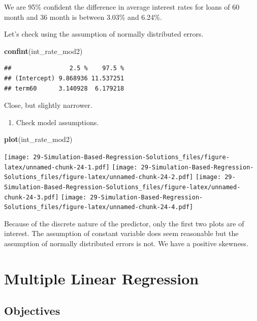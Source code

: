\documentclass[
]{book}
\newenvironment{Shaded}{\begin{snugshade}}{\end{snugshade}}
\newcommand{\KeywordTok}[1]{\textcolor[rgb]{0.13,0.29,0.53}{\textbf{#1}}}
\newcommand{\NormalTok}[1]{#1}
\providecommand{\tightlist}{%
  \setlength{\itemsep}{0pt}\setlength{\parskip}{0pt}}
\begin{document}
We are 95\% confident the difference in average interest rates for loans of 60 month and 36 month is between 3.03\% and 6.24\%.

Let's check using the assumption of normally distributed errors.

\begin{Shaded}
\begin{Highlighting}[]
\KeywordTok{confint}\NormalTok{(int_rate_mod2)}
\end{Highlighting}
\end{Shaded}

\begin{verbatim}
##                2.5 %    97.5 %
## (Intercept) 9.868936 11.537251
## term60      3.140928  6.179218
\end{verbatim}

Close, but slightly narrower.

\begin{enumerate}
\def\labelenumi{\alph{enumi}.}
\setcounter{enumi}{4}
\tightlist
\item
  Check model assumptions.
\end{enumerate}

\begin{Shaded}
\begin{Highlighting}[]
\KeywordTok{plot}\NormalTok{(int_rate_mod2)}
\end{Highlighting}
\end{Shaded}

\texttt{[image: 29-Simulation-Based-Regression-Solutions\_files/figure-latex/unnamed-chunk-24-1.pdf]} \texttt{[image: 29-Simulation-Based-Regression-Solutions\_files/figure-latex/unnamed-chunk-24-2.pdf]} \texttt{[image: 29-Simulation-Based-Regression-Solutions\_files/figure-latex/unnamed-chunk-24-3.pdf]} \texttt{[image: 29-Simulation-Based-Regression-Solutions\_files/figure-latex/unnamed-chunk-24-4.pdf]}

Because of the discrete nature of the predictor, only the first two plots are of interest. The assumption of constant variable does seem reasonable but the assumption of normally distributed errors is not. We have a positive skewness.

\hypertarget{LRMULTI}{%
\chapter{Multiple Linear Regression}\label{LRMULTI}}

\hypertarget{objectives-28}{%
\section{Objectives}\label{objectives-28}}
\end{document}
